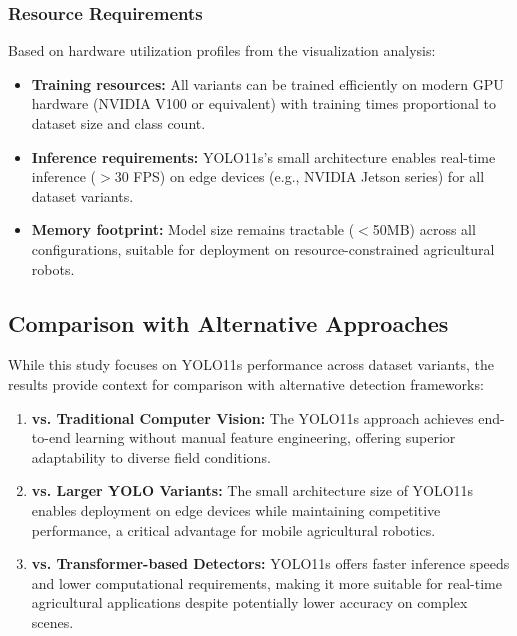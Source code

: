 \subsubsection{Resource Requirements}

Based on hardware utilization profiles from the visualization analysis:

\begin{itemize}
    \item \textbf{Training resources:} All variants can be trained efficiently on modern GPU hardware (NVIDIA V100 or equivalent) with training times proportional to dataset size and class count.
    
    \item \textbf{Inference requirements:} YOLO11s's small architecture enables real-time inference ($>$30 FPS) on edge devices (e.g., NVIDIA Jetson series) for all dataset variants.
    
    \item \textbf{Memory footprint:} Model size remains tractable ($<$50MB) across all configurations, suitable for deployment on resource-constrained agricultural robots.
\end{itemize}

\subsection{Comparison with Alternative Approaches}

While this study focuses on YOLO11s performance across dataset variants, the results provide context for comparison with alternative detection frameworks:

\begin{enumerate}
    \item \textbf{vs. Traditional Computer Vision:} The YOLO11s approach achieves end-to-end learning without manual feature engineering, offering superior adaptability to diverse field conditions.
    
    \item \textbf{vs. Larger YOLO Variants:} The small architecture size of YOLO11s enables deployment on edge devices while maintaining competitive performance, a critical advantage for mobile agricultural robotics.
    
    \item \textbf{vs. Transformer-based Detectors:} YOLO11s offers faster inference speeds and lower computational requirements, making it more suitable for real-time agricultural applications despite potentially lower accuracy on complex scenes.
\end{enumerate}

